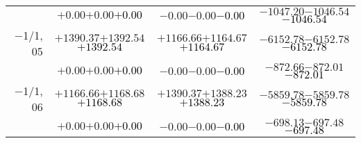 \documentclass[compress]{beamer}
\begin{document}
\begin{frame}
{\begin{tabular}{r | c | c | c}
           & $+0.00$\hspace{0.1 cm}$+0.00$\hspace{0.1 cm}\textcolor{black}{$+0.00$} & $-0.00$\hspace{0.1 cm}$-0.00$\hspace{0.1 cm}\textcolor{black}{$-0.00$} & $-1047.20$\hspace{0.1 cm}$-1046.54$\hspace{0.1 cm}\textcolor{black}{$-1046.54$} \\
$-$1/1, 05 & $+1390.37$\hspace{0.1 cm}$+1392.54$\hspace{0.1 cm}\textcolor{black}{$+1392.54$} & $+1166.66$\hspace{0.1 cm}$+1164.67$\hspace{0.1 cm}\textcolor{black}{$+1164.67$} & $-6152.78$\hspace{0.1 cm}$-6152.78$\hspace{0.1 cm}\textcolor{black}{$-6152.78$} \\
           & $+0.00$\hspace{0.1 cm}$+0.00$\hspace{0.1 cm}\textcolor{black}{$+0.00$} & $-0.00$\hspace{0.1 cm}$-0.00$\hspace{0.1 cm}\textcolor{black}{$-0.00$} & $-872.66$\hspace{0.1 cm}$-872.01$\hspace{0.1 cm}\textcolor{black}{$-872.01$} \\
$-$1/1, 06 & $+1166.66$\hspace{0.1 cm}$+1168.68$\hspace{0.1 cm}\textcolor{black}{$+1168.68$} & $+1390.37$\hspace{0.1 cm}$+1388.23$\hspace{0.1 cm}\textcolor{black}{$+1388.23$} & $-5859.78$\hspace{0.1 cm}$-5859.78$\hspace{0.1 cm}\textcolor{black}{$-5859.78$} \\
           & $+0.00$\hspace{0.1 cm}$+0.00$\hspace{0.1 cm}\textcolor{black}{$+0.00$} & $-0.00$\hspace{0.1 cm}$-0.00$\hspace{0.1 cm}\textcolor{black}{$-0.00$} & $-698.13$\hspace{0.1 cm}$-697.48$\hspace{0.1 cm}\textcolor{black}{$-697.48$} \\
\end{tabular}}
\end{frame}
\end{document}

